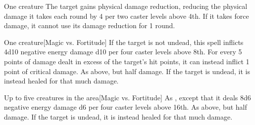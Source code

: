 \begin{spellheader}
    \spellrng{\rngclose}
    \spelldur{\durshort}
\end{spellheader}
\begin{spelleffects}
    \begin{spelltarget}{One creature}
        \spelleffect The target gains physical damage reduction, reducing the physical damage it takes each round by 4  per two caster levels above 4th. If it takes force damage, it cannot use its damage reduction for 1 round.
    \end{spelltarget}
\end{spelleffects}
\begin{spellfooter}
    
\end{spellfooter}

\begin{spellheader}
    \spellrng{\rngclose}
\end{spellheader}
\begin{spelleffects}
    \begin{spelltarget}{One creature}[Magic vs. Fortitude]
        \spellsuccess If the target is not undead, this spell inflicts 4d10 negative energy damage \add d10 per four caster levels above 8th. For every 5 points of damage dealt in excess of the target's hit points, it can instead inflict 1 point of critical damage.
        \spellfailure As above, but half damage.
        \spelleffect If the target is undead, it is instead healed for that much damage.
    \end{spelltarget}
\end{spelleffects}
\begin{spellfooter}
    
\end{spellfooter}

\begin{spellheader}
\end{spellheader}
\begin{spelleffects}
    \begin{spelltargets}{Up to five creatures in the area}[Magic vs. Fortitude]
        \spellsuccess As , except that it deals 8d6 negative energy damage \add d6 per four caster levels above 16th.
        \spellfailure As above, but half damage.
        \spelleffect If the target is undead, it is instead healed for that much damage.
    \end{spelltargets}
\end{spelleffects}
\begin{spellfooter}
    
\end{spellfooter}

